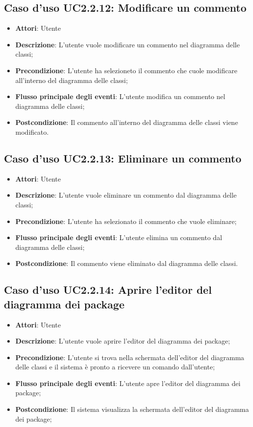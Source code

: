 \documentclass[../AnalisiDeiRequisiti.tex]{subfiles}
\begin{document}
			\subsection{Caso d'uso UC2.2.12: Modificare un commento}
			\begin{itemize}
				\item \textbf{Attori}: Utente
				\item \textbf{Descrizione}: L'utente vuole modificare un commento nel diagramma delle classi;
				\item \textbf{Precondizione}: L'utente ha selezioneto il commento che cuole modificare all'interno del diagramma delle classi;
				\item \textbf{Flusso principale degli eventi}: L'utente modifica un commento nel diagramma delle classi;
				\item \textbf{Postcondizione}: Il commento all'interno del diagramma delle classi viene modificato.
			\end{itemize}
			\subsection{Caso d'uso UC2.2.13: Eliminare un commento}
			\begin{itemize}
				\item \textbf{Attori}: Utente
				\item \textbf{Descrizione}: L'utente vuole eliminare un commento dal diagramma delle classi;
				\item \textbf{Precondizione}: L'utente ha selezionato il commento che vuole eliminare;
				\item \textbf{Flusso principale degli eventi}: L'utente elimina un commento dal diagramma delle classi;
				\item \textbf{Postcondizione}: Il commento viene eliminato dal diagramma delle classi.
			\end{itemize}
			\subsection{Caso d'uso UC2.2.14: Aprire l'editor del diagramma dei package}
			\begin{itemize}
				\item \textbf{Attori}: Utente
				\item \textbf{Descrizione}: L'utente vuole aprire l'editor del diagramma dei package;
				\item \textbf{Precondizione}: L'utente si trova nella schermata dell'editor del diagramma delle classi e il sistema è pronto a ricevere un comando dall'utente;
				\item \textbf{Flusso principale degli eventi}: L'utente apre l'editor del diagramma dei package;
				\item \textbf{Postcondizione}: Il sistema visualizza la schermata dell'editor del diagramma dei package;
			\end{itemize}
\end{document}
